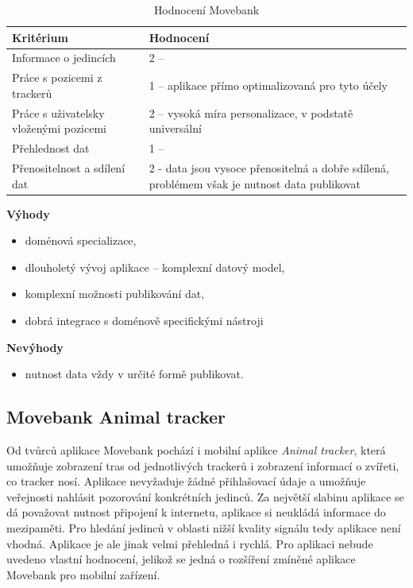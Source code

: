 

\begin{table}[h]
	\begin{tabular}{ l | l }
		Kritérium                              & Hodnocení \\
		\hline			
		Informace o jedincích                  & 2 --           \\
		Práce s pozicemi z trackerů            & 1 -- aplikace přímo optimalizovaná pro tyto účely          \\
		Práce s uživatelsky vloženými pozicemi & 2 -- vysoká míra personalizace, v podstatě universální          \\
		Přehlednost dat                        & 1 --           \\
		Přenositelnost a sdílení dat           & 2 - data jsou vysoce přenositelná a dobře sdílená, problémem však je nutnost data publikovat          \\
		\hline	
	\end{tabular}
	\caption{Hodnocení Movebank}
\end{table}

\textbf{Výhody}

\begin{itemize}
	\item doménová specializace,
	\item dlouholetý vývoj aplikace -- komplexní datový model,
	\item komplexní možnosti publikování dat,
	\item dobrá integrace s doménově specifickými nástroji
\end{itemize}

\textbf{Nevýhody}

\begin{itemize}
	\item nutnost data vždy v určité formě publikovat.
\end{itemize}

\subsection{Movebank Animal tracker}

Od tvůrců aplikace Movebank pochází i mobilní aplikce \emph{Animal tracker}, která umožňuje zobrazení tras od jednotlivých trackerů i zobrazení informací o zvířeti, co tracker nosí. Aplikace nevyžaduje žádné přihlašovací údaje a umožňuje veřejnosti nahlásit pozorování konkrétních jedinců. Za největší slabinu aplikace se dá považovat nutnost připojení k internetu, aplikace si neukládá informace do mezipaměti. Pro hledání jedinců v oblasti nižší kvality signálu tedy aplikace není vhodná. Aplikace je ale jinak velmi přehledná i rychlá. Pro aplikaci nebude uvedeno vlastní hodnocení, jelikož se jedná o rozšíření zmíněné aplikace Movebank pro mobilní zařízení.

